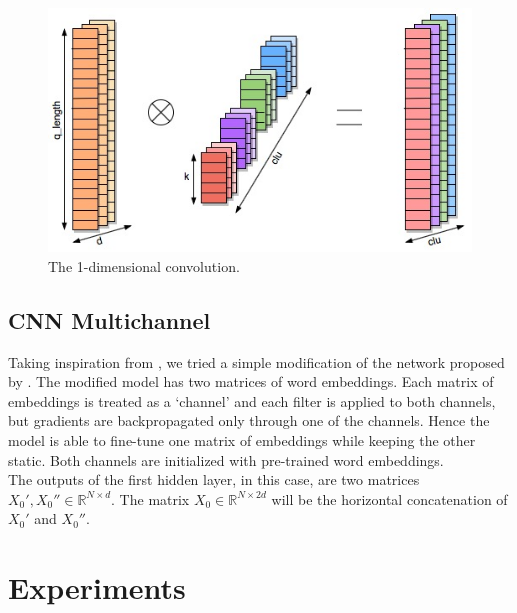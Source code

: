 \documentclass[10pt,twocolumn,letterpaper]{article}
\begin{document}
\begin{figure}[t]
\begin{center}
\includegraphics[width=0.8\linewidth]{img/conv1d.jpg}
\end{center}
\caption{The 1-dimensional convolution.}
\label{fig:conv}
\end{figure}
\subsection{CNN Multichannel}    \label{multichannel}
Taking inspiration from \cite{kim2014convolutional}, we tried a simple modification of the network proposed by \cite{bogdanova2015detecting}. The modified model has two matrices of word embeddings. Each matrix of embeddings is treated as a ‘channel’ and each filter is applied to both channels, but gradients are backpropagated only through one of the channels. Hence the model is able to fine-tune one matrix of embeddings while keeping the other static. Both channels are initialized with pre-trained word embeddings. \\
The outputs of the first hidden layer, in this case, are two matrices $X_0', X_0'' \in \mathbb{R}^{N \times d}$. The matrix $X_0 \in \mathbb{R}^{N \times 2d}$ will be the horizontal concatenation of $X_0'$ and $X_0''$.
  
\section{Experiments}
\end{document}
